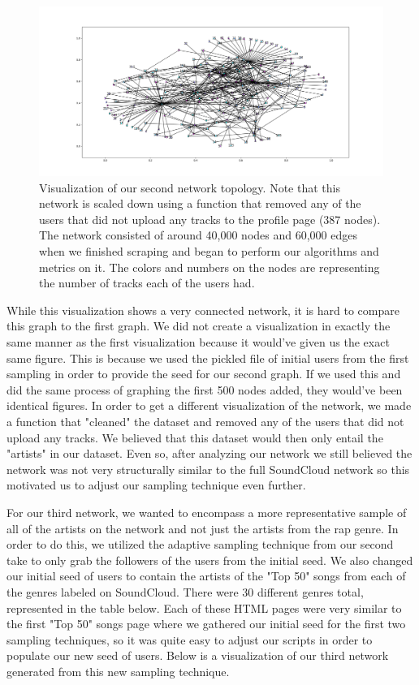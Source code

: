 \documentclass{article}
\begin{document}
\begin{figure}[h]
	\centering
	\includegraphics[scale=0.29]{take_2_visualization}
	\caption{Visualization of our second network topology.  Note that this network is scaled down using a function that removed any of the users that did not upload any tracks to the profile page (387 nodes).  The network consisted of around 40,000 nodes and 60,000 edges when we finished scraping and began to perform our algorithms and metrics on it.  The colors and numbers on the nodes are representing the number of tracks each of the users had.}
\end{figure}

While this visualization shows a very connected network, it is hard to compare this graph to the first graph.  We did not create a visualization in exactly the same manner as the first visualization because it would've given us the exact same figure.  This is because we used the pickled file of initial users from the first sampling in order to provide the seed for our second graph.  If we used this and did the same process of graphing the first 500 nodes added, they would've been identical figures.  In order to get a different visualization of the network, we made a function that "cleaned" the dataset and removed any of the users that did not upload any tracks.  We believed that this dataset would then only entail the "artists" in our dataset.  Even so, after analyzing our network we still believed the network was not very structurally similar to the full SoundCloud network so this motivated us to adjust our sampling technique even further.

For our third network, we wanted to encompass a more representative sample of all of the artists on the network and not just the artists from the rap genre.  In order to do this, we utilized the adaptive sampling technique from our second take to only grab the followers of the users from the initial seed.  We also changed our initial seed of users to contain the artists of the "Top 50" songs from each of the genres labeled on SoundCloud.  There were 30 different genres total, represented in the table below.  Each of these HTML pages were very similar to the first "Top 50" songs page where we gathered our initial seed for the first two sampling techniques, so it was quite easy to adjust our scripts in order to populate our new seed of users.  Below is a visualization of our third network generated from this new sampling technique.
\end{document}
